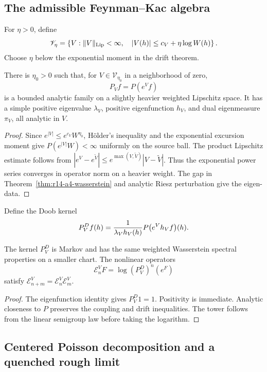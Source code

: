 \subsection{The admissible Feynman--Kac algebra}

For \(\eta>0\), define
\[
 \mathscr V_\eta=
 \left\{V:\|V\|_{\rm Lip}<\infty,\quad
 |V(h)|\le c_V+\eta\log W(h)\right\}.
\]
Choose \(\eta\) below the exponential moment in the drift theorem.

\begin{lemma}
\label{lem:r14-a4-multiplier}
There is \(\eta_0>0\) such that, for
\(V\in\mathscr V_{\eta_0}\) in a neighborhood of zero,
\[
 P_Vf=P(e^Vf)
\]
is a bounded analytic family on a slightly heavier weighted Lipschitz space.
It has a simple positive eigenvalue \(\lambda_V\), positive eigenfunction
\(h_V\), and dual eigenmeasure \(\pi_V\), all analytic in \(V\).
\end{lemma}

\begin{proof}
Since \(e^{|V|}\le e^{c_V}W^{\eta_0}\), Hölder's inequality and the exponential
excursion moment give \(P(e^{|V|}W)<\infty\) uniformly on the source ball.
The product Lipschitz estimate follows from
\(|e^V-e^{\tilde V}|\le e^{\max(V,\tilde V)}|V-\tilde V|\).
Thus the exponential power series converges in operator norm on a heavier
weight.  The gap in Theorem~\ref{thm:r14-a4-wasserstein} and analytic Riesz
perturbation give the eigen-data.
\end{proof}

Define the Doob kernel
\[
 P_V^Df(h)
 ={1\over\lambda_Vh_V(h)}
 P\bigl(e^Vh_Vf\bigr)(h).
\]

\begin{theorem}
\label{thm:r14-a4-doob}
The kernel \(P_V^D\) is Markov and has the same weighted Wasserstein spectral
properties on a smaller chart.  The nonlinear operators
\[
 \mathcal E_n^V F
 =\log (P_V^D)^n(e^F)
\]
satisfy \(\mathcal E_{n+m}^V=\mathcal E_n^V\mathcal E_m^V\).
\end{theorem}

\begin{proof}
The eigenfunction identity gives \(P_V^D1=1\).  Positivity is immediate.
Analytic closeness to \(P\) preserves the coupling and drift inequalities.
The tower follows from the linear semigroup law before taking the logarithm.
\end{proof}

\subsection{Centered Poisson decomposition and a quenched rough limit}


